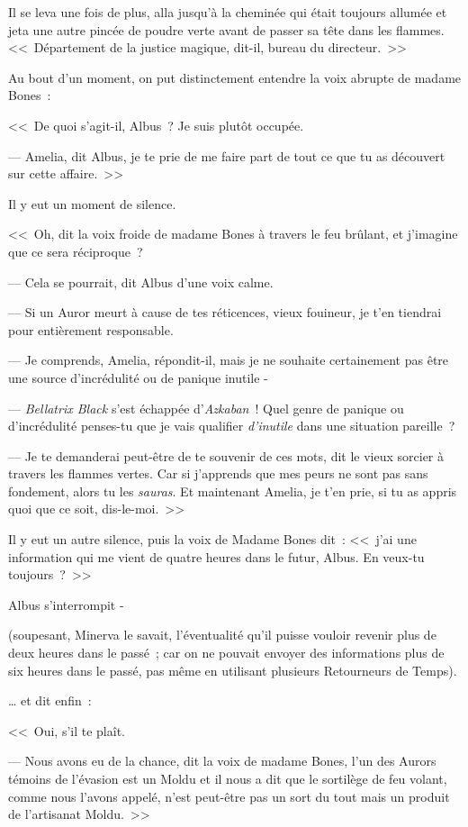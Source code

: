 Il se leva une fois de plus, alla jusqu'à la cheminée qui était toujours allumée et jeta une autre pincée de poudre verte avant de passer sa tête dans les flammes. <<~Département de la justice magique, dit-il, bureau du directeur.~>>

Au bout d'un moment, on put distinctement entendre la voix abrupte de madame Bones~:

<<~De quoi s'agit-il, Albus~? Je suis plutôt occupée.

--- Amelia, dit Albus, je te prie de me faire part de tout ce que tu as découvert sur cette affaire.~>>

Il y eut un moment de silence.

<<~Oh, dit la voix froide de madame Bones à travers le feu brûlant, et j'imagine que ce sera réciproque~?

--- Cela se pourrait, dit Albus d'une voix calme.

--- Si un Auror meurt à cause de tes réticences, vieux fouineur, je t'en tiendrai pour entièrement responsable.

--- Je comprends, Amelia, répondit-il, mais je ne souhaite certainement pas être une source d'incrédulité ou de panique inutile -

--- \emph{Bellatrix Black} s'est échappée d'\emph{Azkaban}~! Quel genre de panique ou d'incrédulité penses-tu que je vais qualifier \emph{d'inutile} dans une situation pareille~?

--- Je te demanderai peut-être de te souvenir de ces mots, dit le vieux sorcier à travers les flammes vertes. Car si j'apprends que mes peurs ne sont pas sans fondement, alors tu les \emph{sauras}. Et maintenant Amelia, je t'en prie, si tu as appris quoi que ce soit, dis-le-moi.~>>

Il y eut un autre silence, puis la voix de Madame Bones dit~: <<~j'ai une information qui me vient de quatre heures dans le futur, Albus. En veux-tu toujours~?~>>

Albus s'interrompit -

(soupesant, Minerva le savait, l'éventualité qu'il puisse vouloir revenir plus de deux heures dans le passé~; car on ne pouvait envoyer des informations plus de six heures dans le passé, pas même en utilisant plusieurs Retourneurs de Temps).

… et dit enfin~:

<<~Oui, s'il te plaît.

--- Nous avons eu de la chance, dit la voix de madame Bones, l'un des Aurors témoins de l'évasion est un Moldu et il nous a dit que le sortilège de feu volant, comme nous l'avons appelé, n'est peut-être pas un sort du tout mais un produit de l'artisanat Moldu.~>>

